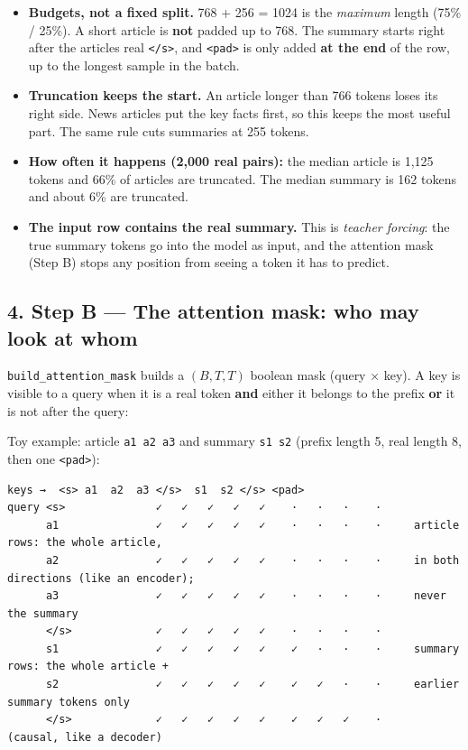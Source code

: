 \documentclass[11pt,a4paper,oneside]{report}
\providecommand{\tightlist}{\setlength{\itemsep}{0pt}\setlength{\parskip}{0pt}}
\begin{document}
\begin{itemize}
\tightlist
\item
  \textbf{Budgets, not a fixed split.} 768 + 256 = 1024 is the \emph{maximum} length (75\% / 25\%). A short article is \textbf{not} padded up to 768. The summary starts right after the article\textquotesingle s real \texttt{\textless{}/\allowbreak{}s\textgreater{}}, and \texttt{\textless{}pad\textgreater{}} is only added \textbf{at the end} of the row, up to the longest sample in the batch.
\item
  \textbf{Truncation keeps the start.} An article longer than 766 tokens loses its right side. News articles put the key facts first, so this keeps the most useful part. The same rule cuts summaries at 255 tokens.
\item
  \textbf{How often it happens (2,000 real pairs):} the median article is 1,125 tokens and 66\% of articles are truncated. The median summary is 162 tokens and about 6\% are truncated.
\item
  \textbf{The input row contains the real summary.} This is \emph{teacher forcing}: the true summary tokens go into the model as input, and the attention mask (Step B) stops any position from seeing a token it has to predict.
\end{itemize}

\subsection{4. Step B --- The attention mask: who may look at whom}\label{4-step-b--the-attention-mask-who-may-look-at-whom}

\texttt{build\_\allowbreak{}attention\_\allowbreak{}mask} builds a \((B, T, T)\) boolean mask (query × key). A key is visible to a query when it is a real token \textbf{and} either it belongs to the prefix \textbf{or} it is not after the query:

\begin{center}\end{center}

Toy example: article \texttt{a1\ a2\ a3} and summary \texttt{s1\ s2} (prefix length 5, real length 8, then one \texttt{\textless{}pad\textgreater{}}):

\begin{Verbatim}[fontsize=\footnotesize]
              keys →  <s> a1  a2  a3 </s>  s1  s2 </s> <pad>
query <s>              ✓   ✓   ✓   ✓   ✓    ·   ·   ·    ·
      a1               ✓   ✓   ✓   ✓   ✓    ·   ·   ·    ·     article rows: the whole article,
      a2               ✓   ✓   ✓   ✓   ✓    ·   ·   ·    ·     in both directions (like an encoder);
      a3               ✓   ✓   ✓   ✓   ✓    ·   ·   ·    ·     never the summary
      </s>             ✓   ✓   ✓   ✓   ✓    ·   ·   ·    ·
      s1               ✓   ✓   ✓   ✓   ✓    ✓   ·   ·    ·     summary rows: the whole article +
      s2               ✓   ✓   ✓   ✓   ✓    ✓   ✓   ·    ·     earlier summary tokens only
      </s>             ✓   ✓   ✓   ✓   ✓    ✓   ✓   ✓    ·     (causal, like a decoder)
\end{Verbatim}
\end{document}
